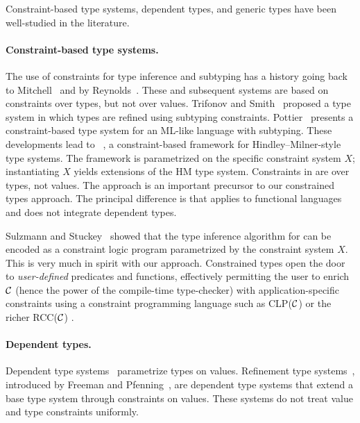 Constraint-based type systems, dependent types, and generic types
have been well-studied in the literature.

\paragraph{Constraint-based type systems.}

The use of constraints for type inference and subtyping has a history
going back to Mitchell~\cite{mitchell84} and by
Reynolds~\cite{reynolds85}.  These and subsequent systems are based on
constraints over types, but not over values.  Trifonov and
Smith~\cite{trifonov96} proposed a type system in which types are
refined using subtyping constraints.
Pottier~\cite{pottier96simplifying} presents a constraint-based type
system for an ML-like language with subtyping.  These developments
lead to \hmx~\cite{sulzmann97type}, a constraint-based framework for
Hindley--Milner-style type systems.  The framework is parametrized on
the specific constraint system $X$; instantiating $X$ yields
extensions of the HM type system.  Constraints in \hmx{} are over
types, not values. The \hmx{} approach is an important precursor to
our constrained types approach. The principal difference is that
\hmx{} applies to functional languages and does not integrate
dependent types.

%
Sulzmann and Stuckey~\cite{sulzmann-hmx-clpx} showed that the
type inference algorithm for \hmx can be encoded as a
constraint logic program parametrized by the constraint system
$X$. This is very much in spirit with our approach.
Constrained types open the door to \emph{user-defined}
predicates and functions, effectively permitting the user to enrich
$\cal C$ (hence the power of the compile-time type-checker)
with application-specific constraints using a constraint
programming language such as CLP($\cal C$) \cite{clp} or the richer
RCC($\cal C$) \cite{DBLP:conf/fsttcs/JagadeesanNS05}.

\paragraph{Dependent types.}

Dependent type
systems~\cite{xi99dependent,calc-constructions,epigram,cayenne}
param\-etrize types on values.  Refinement type
systems~\cite{refinement-types,conditional-types,jones94,sized-types,flanagan-popl06,flanagan-fool06,liquid-types},
introduced by Freeman and Pfenning~\cite{refinement-types}, are dependent type
systems that extend a base type system through constraints on values.  These
systems do not treat value and type constraints uniformly.

